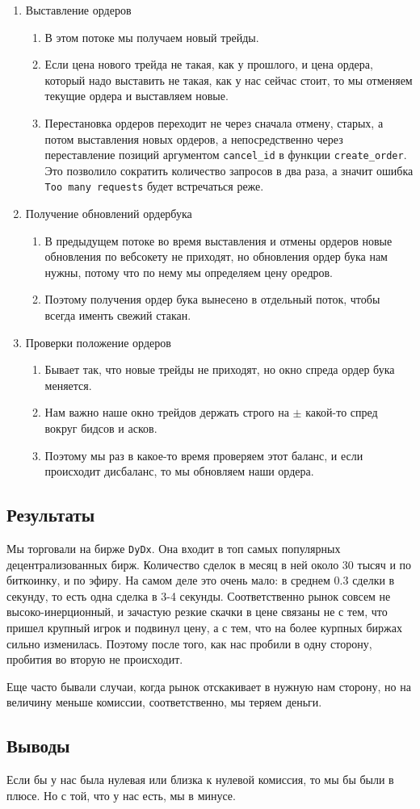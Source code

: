 \begin{enumerate}

\item Выставление ордеров
\begin{enumerate}
    \item В этом потоке мы получаем новый трейды.
    \item Если цена нового трейда не такая, как у прошлого, и цена ордера, который надо выставить не такая, как у нас сейчас стоит, то мы отменяем текущие ордера и выставляем новые.
    \item Перестановка ордеров переходит не через сначала отмену, старых, а потом выставления новых ордеров, а непосредственно через переставление позиций аргументом \texttt{cancel\_id} в функции \texttt{create\_order}. Это позволило сократить количество запросов в два раза, а значит ошибка \texttt{Too many requests} будет встречаться реже.
\end{enumerate}

\item Получение обновлений ордербука
\begin{enumerate}
    \item В предыдущем потоке во время выставления и отмены ордеров новые обновления по вебсокету не приходят, но обновления ордер бука нам нужны, потому что по нему мы определяем цену оредров.
    \item Поэтому получения ордер бука вынесено в отдельный поток, чтобы всегда именть свежий стакан.
\end{enumerate}

\item Проверки положение ордеров
\begin{enumerate}
    \item Бывает так, что новые трейды не приходят, но окно спреда ордер бука меняется.
    \item Нам важно наше окно трейдов держать строго на $\pm$ какой-то спред вокруг бидсов и асков.
    \item Поэтому мы раз в какое-то время проверяем этот баланс, и если происходит дисбаланс, то мы обновляем наши ордера.
\end{enumerate}

\end{enumerate}

\subsection{Результаты}
Мы торговали на бирже \texttt{DyDx}. Она входит в топ самых популярных децентрализованных бирж. Количество сделок в месяц в ней около 30 тысяч и по биткоинку, и по эфиру. На самом деле это очень мало: в среднем 0.3 сделки в секунду, то есть одна сделка в 3-4 секунды. Соответственно рынок совсем не высоко-инерционный, и зачастую резкие скачки в цене связаны не с тем, что пришел крупный игрок и подвинул цену, а с тем, что на более курпных биржах сильно изменилась. Поэтому после того, как нас пробили в одну сторону, пробития во вторую не происходит.

Еще часто бывали случаи, когда рынок отскакивает в нужную нам сторону, но на величину меньше комиссии, соответственно, мы теряем деньги.

\subsection{Выводы}

Если бы у нас была нулевая или близка к нулевой комиссия, то мы бы были в плюсе. Но с той, что у нас есть, мы в минусе.
